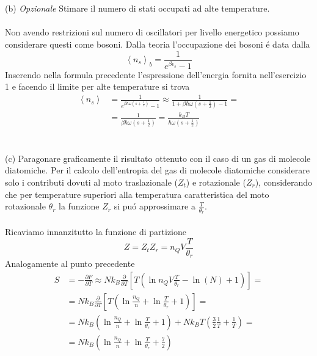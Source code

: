 \documentclass[a4paper]{article}
\begin{document}
        \\
        \\
        (b) \emph{Opzionale} Stimare il numero di stati occupati ad alte temperature.
        \\
        \\
        Non avendo restrizioni sul numero di oscillatori per livello energetico possiamo considerare questi come bosoni.
        Dalla teoria l'occupazione dei bosoni \'e data dalla
        \begin{equation*}
            \left\langle n_s \right\rangle_b=\frac{1}{e^{\beta\epsilon_s}-1}
        \end{equation*}
        Inserendo nella formula precedente l'espressione dell'energia fornita nell'esercizio 1 e facendo il limite per alte temperature si trova
        \begin{equation*}
            \begin{split}
                \left\langle n_s \right\rangle&=\frac{1}{e^{\beta\hbar\omega\left(s+\frac{1}{2}\right)}-1}\approx\frac{1}{1+\beta\hbar\omega\left(s+\frac{1}{2}\right)-1}=\\
                &=\frac{1}{\beta\hbar\omega\left(s+\frac{1}{2}\right)}=\frac{k_BT}{\hbar\omega\left(s+\frac{1}{2}\right)}
            \end{split}
        \end{equation*}
        \\
        \\
        (c) Paragonare graficamente il risultato ottenuto con il caso di un gas di molecole diatomiche.
        Per il calcolo dell'entropia del gas di molecole diatomiche considerare solo i contributi dovuti al moto traslazionale ($Z_t$) e rotazionale ($Z_r$), considerando che per temperature superiori alla temperatura caratteristica del moto rotazionale $\theta_r$ la funzione $Z_r$ si pu\'o approssimare a $\frac{T}{\theta_r}$.
        \\
        \\
        Ricaviamo innanzitutto la funzione di partizione
        \begin{equation*}
            Z=Z_tZ_r=n_QV\frac{T}{\theta_r}
        \end{equation*}
        Analogamente al punto precedente
        \begin{equation*}
            \begin{split}
                S&=-\frac{\partial F}{\partial T}\approx Nk_B\frac{\partial}{\partial T}\left[T\left(\ln n_QV\frac{T}{\theta_r}-\ln(N) +1\right)\right]=\\
                &=Nk_B\frac{\partial}{\partial T}\left[T\left(\ln\frac{n_Q}{n}+\ln\frac{T}{\theta_r}+1\right)\right]=\\
                &=Nk_B\left(\ln\frac{n_Q}{n}+\ln\frac{T}{\theta_r}+1\right)+Nk_BT\left(\frac{3}{2}\frac{1}{T}+\frac{1}{T}\right)=\\
                &=Nk_B\left(\ln\frac{n_Q}{n}+\ln\frac{T}{\theta_r}+\frac{7}{2}\right)
            \end{split}
        \end{equation*}
\end{document}
